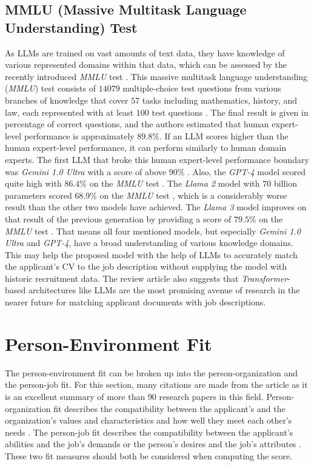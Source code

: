 \documentclass[draft,final]{thesisclass} %
\begin{document}
\subsection{MMLU (Massive Multitask Language Understanding) Test}
As \gls{LLM}s are trained on vast amounts of text data, they have knowledge of various represented domains within that data, which can be assessed by the recently introduced \textit{MMLU} test \parencite{mmlu}.
This massive multitask language understanding (\textit{MMLU}) test consists of $14079$ multiple-choice test questions from various branches of knowledge that cover $57$ tasks including mathematics, history, and law, each represented with at least $100$ test questions \parencite[1-3]{mmlu}.
The final result is given in percentage of correct questions, and the authors estimated that human expert-level performance is approximately $89.8\%$.
If an \gls{LLM} scores higher than the human expert-level performance, it can perform similarly to human domain experts.
The first \gls{LLM} that broke this human expert-level performance boundary was \textit{Gemini 1.0 Ultra} with a score of above $90\%$ \parencite[1]{gemini}.
Also, the \textit{GPT-4} model scored quite high with $86.4\%$ on the \textit{MMLU} test \parencite[32]{gpt4}.
The \textit{Llama 2} model with $70$ billion parameters scored $68.9\%$ on the \textit{MMLU} test \parencite[49]{llama2}, which is a considerably worse result than the other two models have achieved. The \textit{Llama 3} model improves on that result of the previous generation by providing a score of $79.5\%$ on the \textit{MMLU} test \parencite[1]{llama3}.
That means all four mentioned models, but especially \textit{Gemini 1.0 Ultra} and \textit{GPT-4}, have a broad understanding of various knowledge domains.
This may help the proposed model with the help of \gls{LLM}s to accurately match the applicant's \acs{CV} to the job description without supplying the model with historic recruitment data. The review article \textcite[13]{perspective_ai_research_job_matching} also suggests that \textit{Transformer}-based architectures like \gls{LLM}s are the most promising avenue of research in the nearer future for matching applicant documents with job descriptions.

\section{Person-Environment Fit}
The person-environment fit can be broken up into the person-organization and the person-job fit.
For this section, many citations are made from the article \textcite{po_and_pj_fit_literature_review} as it is an excellent summary of more than $90$ research papers in this field.
Person-organization fit describes the compatibility between the applicant's and the organization's values and characteristics and how well they meet each other's needs \parencite[179]{po_and_pj_fit_literature_review}.
The person-job fit describes the compatibility between the applicant's abilities and the job's demands or the person's desires and the job's attributes \parencite[179]{po_and_pj_fit_literature_review}.
These two fit measures should both be considered when computing the score.
\end{document}
